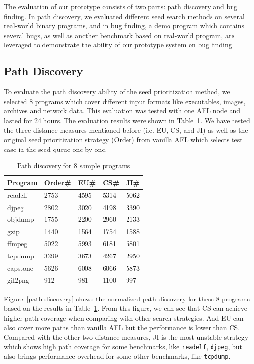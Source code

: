 The evaluation of our prototype consists of two parts: path discovery and bug finding. In path discovery, we evaluated different seed search methods on several real-world binary programs, and in bug finding, a demo program which contains several bugs, as well as another benchmark based on real-world program, are leveraged to demonstrate the ability of our prototype system on bug finding.

\subsection{Path Discovery}
To evaluate the path discovery ability of the seed prioritization method, we selected 8 programs which cover different input formats like executables, images, archives and network data. This evaluation was tested with one AFL node and lasted for 24 hours. The evaluation results were shown in Table~\ref{PD-8samples}. We have tested the three distance measures mentioned before (i.e. EU, CS, and JI) as well as the original seed prioritization strategy (Order) from vanilla AFL which selects test case in the seed queue one by one.  

\begin{table}
  \caption{\label{PD-8samples}Path discovery for 8 sample programs}
  \centering
	\begin{tabular}{p{2cm}<{\centering} p{1.5cm}<{\centering} p{1.5cm}<{\centering} p{1.5cm}<{\centering} p{1.5cm}<{\centering}}
		\toprule
		Program  & Order\# & EU\# & CS\# & JI\# \\ 
		\midrule
		readelf  &    2753 & 4595 & 5314 & 5062 \\
		 djpeg   &    2802 & 3020 & 4198 & 3390 \\
		objdump  &    1755 & 2200 & 2960 & 2133 \\
		  gzip   &    1440 & 1564 & 1754 & 1588 \\
		 ffmpeg  &    5022 & 5993 & 6181 & 5801 \\
		tcpdump  &    3399 & 3673 & 4267 & 2950 \\
		capstone &    5626 & 6008 & 6066 & 5873 \\
		gif2png  &     912 &  981 & 1100 &  997 \\ 
		\bottomrule
	\end{tabular}
\end{table}

Figure~\ref{path-discovery} shows the normalized path discovery for these 8 programs based on the results in Table~\ref{PD-8samples}. From this figure, we can see that CS can achieve higher path coverage when comparing with other search strategies. And EU can also cover more paths than vanilla AFL but the performance is lower than CS. Compared with the other two distance measures, JI is the most unstable strategy which shows high path coverage for some benchmarks, like \texttt{readelf}, \texttt{djpeg}, but also brings performance overhead for some other benchmarks, like \texttt{tcpdump}.

